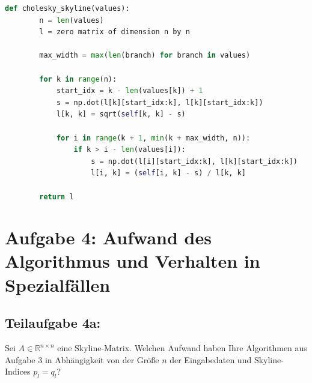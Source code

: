\documentclass[]{article}
\begin{document}
\begin{lstlisting}[language=Python, caption=optimierter Algorithmus für die Cholesky Zerlegung einer Skyline-Matrix]
	def cholesky_skyline(values):
	    n = len(values)
	    l = zero matrix of dimension n by n
	
	    max_width = max(len(branch) for branch in values)
	
	    for k in range(n):
	        start_idx = k - len(values[k]) + 1
	        s = np.dot(l[k][start_idx:k], l[k][start_idx:k])
	        l[k, k] = sqrt(self[k, k] - s)
	
	        for i in range(k + 1, min(k + max_width, n)):
	            if k > i - len(values[i]):
	                s = np.dot(l[i][start_idx:k], l[k][start_idx:k])
	                l[i, k] = (self[i, k] - s) / l[k, k]
	
	    return l
\end{lstlisting}

\section*{Aufgabe 4: Aufwand des Algorithmus und Verhalten in Spezialfällen}
\subsection*{Teilaufgabe 4a:}
Sei $A \in \mathbb{R}^{n\times n}$ eine Skyline-Matrix. Welchen Aufwand haben Ihre Algorithmen aus Aufgabe 3 in Abhängigkeit von der Größe $n$ der Eingabedaten und Skyline-Indices $p_l = q_l$?
\end{document}
